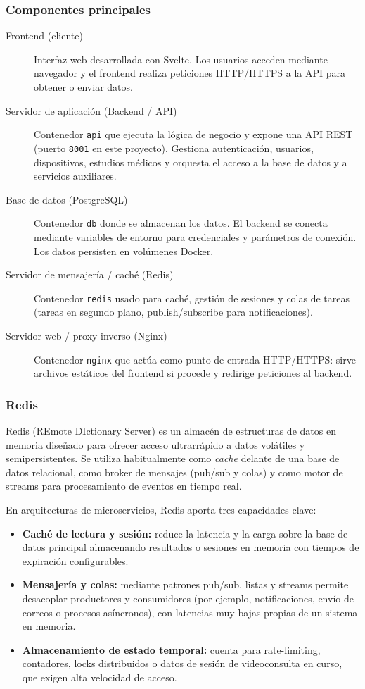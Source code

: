 \documentclass[12pt, a4paper]{article}
\begin{document}
\subsubsection{Componentes principales}
\begin{description}
	\item[Frontend (cliente)] Interfaz web desarrollada con Svelte. Los usuarios acceden mediante navegador y el frontend realiza peticiones HTTP/HTTPS a la API para obtener o enviar datos.
	\item[Servidor de aplicación (Backend / API)] Contenedor \texttt{api} que ejecuta la lógica de negocio y expone una API REST (puerto \texttt{8001} en este proyecto). Gestiona autenticación, usuarios, dispositivos, estudios médicos y orquesta el acceso a la base de datos y a servicios auxiliares.
	\item[Base de datos (PostgreSQL)] Contenedor \texttt{db} donde se almacenan los datos. El backend se conecta mediante variables de entorno para credenciales y parámetros de conexión. Los datos persisten en volúmenes Docker.
	\item[Servidor de mensajería / caché (Redis)] Contenedor \texttt{redis} usado para caché, gestión de sesiones y colas de tareas (tareas en segundo plano, publish/subscribe para notificaciones).
	\item[Servidor web / proxy inverso (Nginx)] Contenedor \texttt{nginx} que actúa como punto de entrada HTTP/HTTPS: sirve archivos estáticos del frontend si procede y redirige peticiones al backend. 
\end{description}

\subsubsection{Redis}
Redis (REmote DIctionary Server) es un almacén de estructuras de datos en memoria diseñado para ofrecer acceso ultrarrápido a datos volátiles y semipersistentes. Se utiliza habitualmente como \emph{cache} delante de una base de datos relacional, como broker de mensajes (pub/sub y colas) y como motor de streams para procesamiento de eventos en tiempo real. \cite{redis_persistence}

En arquitecturas de microservicios, Redis aporta tres capacidades clave:
\begin{itemize}
	\item \textbf{Caché de lectura y sesión:} reduce la latencia y la carga sobre la base de datos principal almacenando resultados o sesiones en memoria con tiempos de expiración configurables.
	\item \textbf{Mensajería y colas:} mediante patrones pub/sub, listas y streams permite desacoplar productores y consumidores (por ejemplo, notificaciones, envío de correos o procesos asíncronos), con latencias muy bajas propias de un sistema en memoria. \cite{redis_pubsub,redis_streams}
	\item \textbf{Almacenamiento de estado temporal:} cuenta para rate-limiting, contadores, locks distribuidos o datos de sesión de videoconsulta en curso, que exigen alta velocidad de acceso.
\end{itemize}
\end{document}
